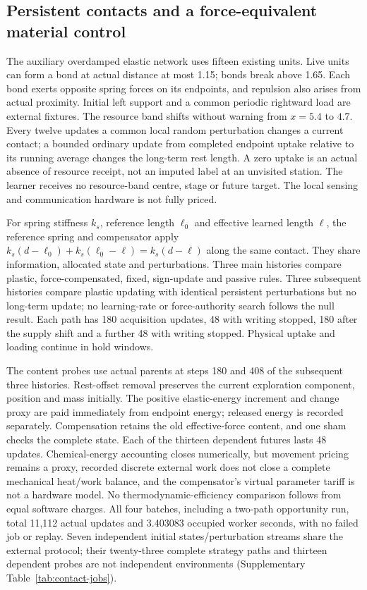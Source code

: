 \subsection*{Persistent contacts and a force-equivalent material control}

The auxiliary overdamped elastic network uses fifteen existing units. Live units can form a bond at actual distance at most 1.15; bonds break above 1.65. Each bond exerts opposite spring forces on its endpoints, and repulsion also arises from actual proximity. Initial left support and a common periodic rightward load are external fixtures. The resource band shifts without warning from $x=5.4$ to $4.7$. Every twelve updates a common local random perturbation changes a current contact; a bounded ordinary update from completed endpoint uptake relative to its running average changes the long-term rest length. A zero uptake is an actual absence of resource receipt, not an imputed label at an unvisited station. The learner receives no resource-band centre, stage or future target. The local sensing and communication hardware is not fully priced.

For spring stiffness $k_s$, reference length $\ell_0$ and effective learned length $\ell$, the reference spring and compensator apply $k_s(d-\ell_0)+k_s(\ell_0-\ell)=k_s(d-\ell)$ along the same contact. They share information, allocated state and perturbations. Three main histories compare plastic, force-compensated, fixed, sign-update and passive rules. Three subsequent histories compare plastic updating with identical persistent perturbations but no long-term update; no learning-rate or force-authority search follows the null result. Each path has 180 acquisition updates, 48 with writing stopped, 180 after the supply shift and a further 48 with writing stopped. Physical uptake and loading continue in hold windows.

The content probes use actual parents at steps 180 and 408 of the subsequent three histories. Rest-offset removal preserves the current exploration component, position and mass initially. The positive elastic-energy increment and change proxy are paid immediately from endpoint energy; released energy is recorded separately. Compensation retains the old effective-force content, and one sham checks the complete state. Each of the thirteen dependent futures lasts 48 updates. Chemical-energy accounting closes numerically, but movement pricing remains a proxy, recorded discrete external work does not close a complete mechanical heat/work balance, and the compensator's virtual parameter tariff is not a hardware model. No thermodynamic-efficiency comparison follows from equal software charges. All four batches, including a two-path opportunity run, total 11,112 actual updates and 3.403083 occupied worker seconds, with no failed job or replay. Seven independent initial states/perturbation streams share the external protocol; their twenty-three complete strategy paths and thirteen dependent probes are not independent environments (Supplementary Table~\ref{tab:contact-jobs}).


